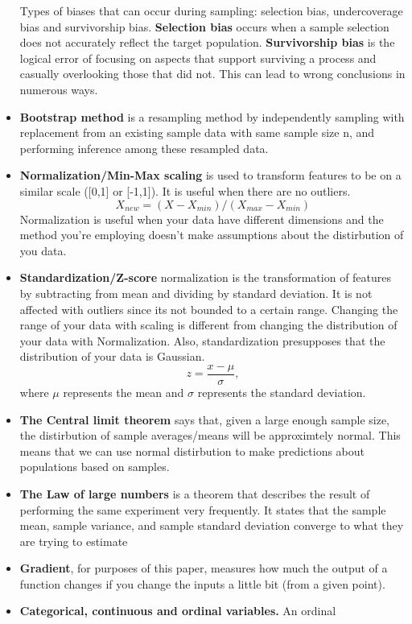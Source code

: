\documentclass[
  letterpaper,
  DIV=11,
  numbers=noendperiod]{scrreprt}
\begin{document}
\begin{itemize}
  Types of biases that can occur during sampling: selection bias,
  undercoverage bias and survivorship bias. \textbf{Selection bias}
  occurs when a sample selection does not accurately reflect the target
  population. \textbf{Survivorship bias} is the logical error of
  focusing on aspects that support surviving a process and casually
  overlooking those that did not. This can lead to wrong conclusions in
  numerous ways.
\item
  \textbf{Bootstrap method} is a resampling method by independently
  sampling with replacement from an existing sample data with same
  sample size n, and performing inference among these resampled data.
\item
  \textbf{Normalization/Min-Max scaling} is used to transform features
  to be on a similar scale ({[}0,1{]} or {[}-1,1{]}). It is useful when
  there are no outliers.
  \[ X_{new} = (X - X_{min}) / (X_{max} - X_{min}) \] Normalization is
  useful when your data have different dimensions and the method you're
  employing doesn't make assumptions about the distirbution of you data.
\item
  \textbf{Standardization/Z-score} normalization is the transformation
  of features by subtracting from mean and dividing by standard
  deviation. It is not affected with outliers since its not bounded to a
  certain range. Changing the range of your data with scaling is
  different from changing the distribution of your data with
  Normalization. Also, standardization presupposes that the distribution
  of your data is Gaussian. \[ z = \frac{x-\mu}{\sigma}, \] where
  \(\mu\) represents the mean and \(\sigma\) represents the standard
  deviation.
\item
  \textbf{The Central limit theorem} says that, given a large enough
  sample size, the distirbution of sample averages/means will be
  approximtely normal. This means that we can use normal distirbution to
  make predictions about populations based on samples.
\item
  \textbf{The Law of large numbers} is a theorem that describes the
  result of performing the same experiment very frequently. It states
  that the sample mean, sample variance, and sample standard deviation
  converge to what they are trying to estimate
\item
  \textbf{Gradient}, for purposes of this paper, measures how much the
  output of a function changes if you change the inputs a little bit
  (from a given point).
\item
  \textbf{Categorical, continuous and ordinal variables.} An ordinal

\end{itemize}
\end{document}
